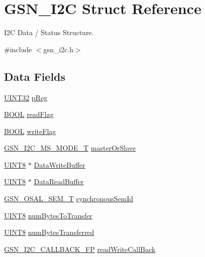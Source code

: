 \hypertarget{a00098}{
\section{GSN\_\-I2C Struct Reference}
\label{a00098}
}


I2C Data / Status Structure.  




{\ttfamily \#include $<$gsn\_\-i2c.h$>$}

\subsection*{Data Fields}
\begin{DoxyCompactItemize}
\item 
\hyperlink{a00660_gae1e6edbbc26d6fbc71a90190d0266018}{UINT32} \hyperlink{a00098_a733fb7afbc3bd37a546de0e37c12f150}{pReg}
\item 
\hyperlink{a00660_ga1f04022c0a182c51c059438790ea138c}{BOOL} \hyperlink{a00098_acaa70240adc835acc872ba55e3bf494d}{readFlag}
\item 
\hyperlink{a00660_ga1f04022c0a182c51c059438790ea138c}{BOOL} \hyperlink{a00098_a549205d9ecbb1ed7a82528163952fd6c}{writeFlag}
\item 
\hyperlink{a00649_ga72605883ea904f4ee6c310a25142a0ab}{GSN\_\-I2C\_\-MS\_\-MODE\_\-T} \hyperlink{a00098_ab6c0e135c554375f2356d63427904425}{masterOrSlave}
\item 
\hyperlink{a00660_gab27e9918b538ce9d8ca692479b375b6a}{UINT8} $\ast$ \hyperlink{a00098_a8f9a58f073e6e06f613db1a7c471ed1a}{DataWriteBuffer}
\item 
\hyperlink{a00660_gab27e9918b538ce9d8ca692479b375b6a}{UINT8} $\ast$ \hyperlink{a00098_ac7efaea2646c7c874764140d2c15894e}{DataReadBuffer}
\item 
\hyperlink{a00628_gab4b3554407ce22b940e2fcd3faf5fd47}{GSN\_\-OSAL\_\-SEM\_\-T} \hyperlink{a00098_a9fe2614928fcf7fb1cd481dea841923d}{synchronousSemId}
\item 
\hyperlink{a00660_gab27e9918b538ce9d8ca692479b375b6a}{UINT8} \hyperlink{a00098_ab3fffdb20c15ad5ef5d0ca8b48de5c58}{numBytesToTransfer}
\item 
\hyperlink{a00660_gab27e9918b538ce9d8ca692479b375b6a}{UINT8} \hyperlink{a00098_a3c64997ab8583dffe330d8ffd3097f42}{numBytesTransferred}
\item 
\hyperlink{a00649_gac8a6faecb999f4f891344abbbfc08914}{GSN\_\-I2C\_\-CALLBACK\_\-FP} \hyperlink{a00098_a864e2e8a49d07675db4d75a711b96c24}{readWriteCallBack}

\end{DoxyCompactItemize}
